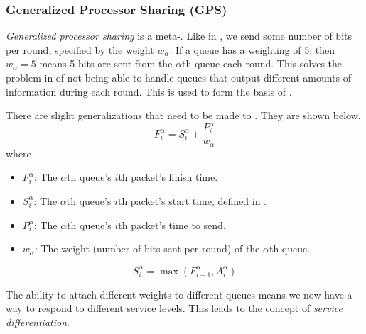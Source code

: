 \subsubsection{Generalized Processor Sharing (GPS)}\label{subsubsec:Generalized_Processor_Sharing}
\begin{definition}\label{def:Generalized_Processor_Sharing}
  \emph{Generalized processor sharing} is a  meta-.
  Like in , we send some number of bits per round, specified by the weight $w_{\alpha}$.
  If a queue has a weighting of 5, then $w_{\alpha} = 5$ means 5 bits are sent from the $\alpha$th queue each round.
  This solves the problem in  of not being able to handle queues that output different amounts of information during each round.
  This is used to form the basis of .

  There are slight generalizations that need to be made to .
  They are shown below.
  \begin{equation}\label{eq:GPS_Finish_Time}
    F_{i}^{\alpha} = S_{i}^{\alpha} + \frac{P_{i}^{\alpha}}{w_{\alpha}}
  \end{equation}
  where
  \begin{itemize}[noitemsep]
  \item $F_{i}^{\alpha}$: The $\alpha$th queue's $i$th packet's finish time.
  \item $S_{i}^{\alpha}$: The $\alpha$th queue's $i$th packet's start time, defined in .
  \item $P_{i}^{\alpha}$: The $\alpha$th queue's $i$th packet's time to send.
  \item $w_{\alpha}$: The weight (number of bits sent per round) of the $\alpha$th queue.
  \end{itemize}

  \begin{equation}\label{eq:GPS_Start_Time}
    S_{i}^{\alpha} = \max \left( F_{i-1}^{\alpha}, A_{i}^{\alpha} \right)
  \end{equation}

  \begin{remark}\label{rmk:GPS_Service_Differentiation}
    The ability to attach different weights to different queues means we now have a way to respond to different service levels.
    This leads to the concept of \emph{service differentiation}.
  \end{remark}
\end{definition}

